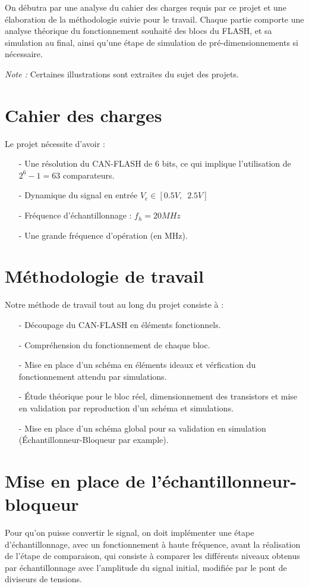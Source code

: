 \documentclass[11pt]{article}
\begin{document}
On d\'ebutra par une analyse du cahier des charges requis par ce projet et une \'elaboration de la m\'ethodologie suivie pour le travail. Chaque partie comporte une analyse th\'eorique du fonctionnement souhait\'e des blocs du FLASH, et sa simulation au final, ainsi qu'une \'etape de simulation de pr\'e-dimensionnements si n\'ecessaire.

\textit{Note :} Certaines illustrations sont extraites du sujet des projets\cite{Projets-Analog}.

\section{Cahier des charges}
Le projet n\'ecessite d'avoir :
\begin{itemize}
\item[-] Une r\'esolution du CAN-FLASH de 6 bits, ce qui implique l'utilisation de $2^{6} -1 = 63 $ comparateurs.
\item[-] Dynamique du signal en entr\'ee $V_e \in [0.5 V,\phantom{2} 2.5V]$
\item[-] Fr\'equence d'\'echantillonnage : $f_h = 20 MHz $
\item[-] Une grande fr\'equence d'op\'eration (en MHz).
\end{itemize}

\section{M\'ethodologie de travail}
Notre m\'ethode de travail tout au long du projet consiste \`a :
\begin{itemize}
  \item[-] D\'ecoupage du CAN-FLASH en \'el\'ements fonctionnels.
  \item[-] Compr\'ehension du fonctionnement de chaque bloc.
  \item[-] Mise en place d'un sch\'ema en \'el\'ements ideaux et v\'erfication du fonctionnement attendu par simulations.
  \item[-] \'Etude th\'eorique pour le bloc r\'eel, dimensionnement des transistors et mise en validation par reproduction
  d'un sch\'ema et simulations.
  \item[-] Mise en place d'un sch\'ema global pour sa validation en simulation (\'Echantillonneur-Bloqueur par example).
\end{itemize}



\clearpage

\section{Mise en place de l'\'echantillonneur-bloqueur}
Pour qu'on puisse convertir le signal, on doit impl\'ementer une \'etape d'\'echantillonnage, avec un fonctionnement \`a haute fr\'equence,
avant la r\'ealisation de l'\'etape de comparaison, qui consiste \`a comparer les diff\'erents niveaux obtenus par \'echantillonnage avec l'amplitude du signal initial,
modifi\'ee par le pont de diviseurs de tensions.
\end{document}
